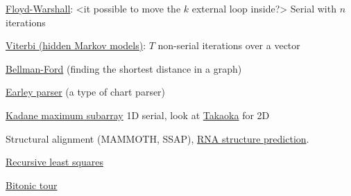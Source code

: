 {\color{red}
\item \href{http://en.wikipedia.org/wiki/Floyd-Warshall_algorithm}{Floyd-Warshall}: <it possible to move the $k$ external loop inside?> Serial with $n$ iterations
\item \href{http://en.wikipedia.org/wiki/Viterbi_algorithm}{Viterbi \footnotesize (hidden Markov models)}: $T$ non-serial iterations over a vector
\item \href{http://en.wikipedia.org/wiki/Bellman-Ford_algorithm}{Bellman-Ford} (finding the shortest distance in a graph)
\item \href{http://en.wikipedia.org/wiki/Earley_parser#Pseudocode}{Earley parser} (a type of chart parser)
\item \href{http://en.wikipedia.org/wiki/Maximum_subarray_problem}{Kadane maximum subarray} 1D serial, look at 
\href{http://www.cosc.canterbury.ac.nz/tad.takaoka/cats02.pdf}{Takaoka} for 2D
\item Structural alignment (MAMMOTH, SSAP), \href{http://rna.tbi.univie.ac.at/cgi-bin/RNAfold.cgi}{RNA structure prediction}.
\item \href{http://en.wikipedia.org/wiki/Recursive_least_squares_filter}{Recursive least squares}
\item \href{http://www.math.utep.edu/Faculty/pmdelgado2/courses/adv_algorithms/homework-08_anser.pdf}{Bitonic tour}
}
\ule


